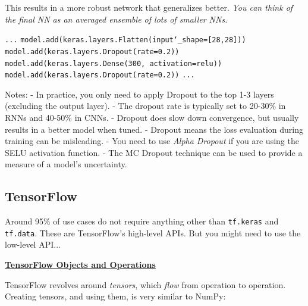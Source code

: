 This results in a more robust network that generalizes better.\newline
\textit{You can think of the final NN as an averaged ensemble of lots of smaller NNs.}

\texttt{...}\newline
\texttt{model.add(keras.layers.Flatten(input\char`_shape=[28,28]))}\newline
\texttt{model.add(keras.layers.Dropout(rate=0.2))}\newline
\texttt{model.add(keras.layers.Dense(300, activation=\textquotesingle relu\textquotesingle))}\newline
\texttt{model.add(keras.layers.Dropout(rate=0.2))}\newline
\texttt{...}\newline

Notes:\newline
- In practice, you only need to apply Dropout to the top 1-3 layers (excluding the output layer).\newline
- The dropout rate is typically set to 20-30\% in RNNs and 40-50\% in CNNs.\newline
- Dropout does slow down convergence, but usually results in a better model when tuned.\newline
- Dropout means the loss evaluation during training can be misleading.\newline
- You need to use \textit{Alpha Dropout} if you are using the SELU activation function.\newline
- The MC Dropout technique can be used to provide a measure of a model's uncertainty.

\newpage
\subsection{TensorFlow}

Around 95\% of use cases do not require anything other than \texttt{tf.keras} and \texttt{tf.data}.\newline
These are TensorFlow's high-level APIs.
But you might need to use the low-level API...\newline

\textbf{\underline{TensorFlow Objects and Operations}}

TensorFlow revolves around \textit{tensors}, which \textit{flow} from operation to operation.\newline
Creating tensors, and using them, is very similar to NumPy:


